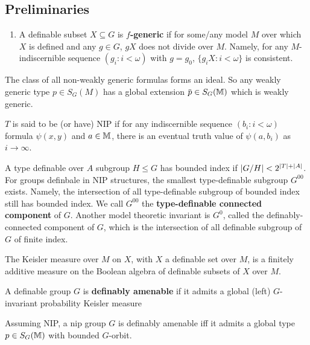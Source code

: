 \documentclass[11pt]{article}
\begin{document}
\subsection{Preliminaries}
\label{sec:org1c90c04}
\begin{definition}[]
\begin{enumerate}
\item A definable subset \(X\subseteq G\) is  \textbf{\(f\)-generic} if for some/any model \(M\) over which \(X\) is
defined and any \(g\in G\), \(gX\) does not divide over \(M\). Namely, for
any \(M\)-indiscernible sequence \((g_i:i<\omega)\) with \(g=g_0\), \(\{g_iX:i<\omega\}\)  is consistent.
\end{enumerate}
\end{definition}

\begin{remark}
\label{1.2}
The class of all non-weakly generic formulas forms an ideal. So any weakly generic
type \(p\in S_G(M)\) has a global extension \(\barp\in S_G(\M)\) which is weakly generic.
\end{remark}

\(T\) is said to be (or have) NIP if for any indiscernible sequence \((b_i:i<\omega)\)
formula \(\psi(x,y)\) and \(a\in\mathbb{M}\), there is an eventual truth value of \(\psi(a,b_i)\) as \(i\to\infty\).

A type definable over \(A\) subgroup \(H\le G\) has bounded index
if \(\abs{G/H}<2^{\abs{T}+\abs{A}}\). For groups definbale in NIP structures, the smallest
type-definable subgroup \(G^{00}\) exists. Namely, the intersection of all type-definable
subgroup of bounded index still has bounded index. We call \(G^{00}\) the \textbf{type-definable
connected component} of \(G\). Another model theoretic invariant is \(G^0\), called the
definably-connected component of \(G\), which is the intersection of all definable subgroup
of \(G\) of finite index.

The Keisler measure over \(M\) on \(X\), with \(X\) a definable set over \(M\), is a finitely
additive measure on the Boolean algebra of definable subsets of \(X\) over \(M\).

A definable group \(G\) is \textbf{definably amenable} if it admits a global (left) \(G\)-invariant
probability Keisler measure

\begin{fact}[]
\label{fact1.3}
Assuming NIP, a nip group \(G\) is definably amenable iff it admits a global type \(p\in S_G(\mathbb{M})\)
with bounded \(G\)-orbit.
\end{fact}
\end{document}
